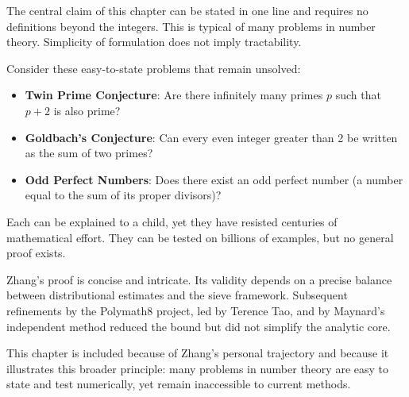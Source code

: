 \begin{commentary}
The central claim of this chapter can be stated in one line and requires no definitions beyond the integers. This is typical of many problems in number theory. Simplicity of formulation does not imply tractability.

Consider these easy-to-state problems that remain unsolved:
\begin{itemize}
\item \textbf{Twin Prime Conjecture}: Are there infinitely many primes $p$ such that $p+2$ is also prime?
\item \textbf{Goldbach's Conjecture}: Can every even integer greater than 2 be written as the sum of two primes?
\item \textbf{Odd Perfect Numbers}: Does there exist an odd perfect number (a number equal to the sum of its proper divisors)?
\end{itemize}

Each can be explained to a child, yet they have resisted centuries of mathematical effort. They can be tested on billions of examples, but no general proof exists.

Zhang's proof is concise and intricate. Its validity depends on a precise balance between distributional estimates and the sieve framework. Subsequent refinements by the Polymath8 project, led by Terence Tao, and by Maynard's independent method reduced the bound but did not simplify the analytic core.

This chapter is included because of Zhang's personal trajectory and because it illustrates this broader principle: many problems in number theory are easy to state and test numerically, yet remain inaccessible to current methods.
\end{commentary}
